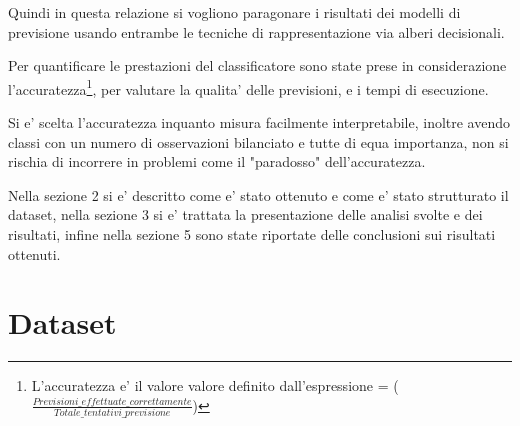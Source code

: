 \documentclass[runningheads]{llncs}
\begin{document}
Quindi in questa relazione si vogliono paragonare i risultati dei modelli di previsione usando entrambe le tecniche di rappresentazione via alberi decisionali. 

Per quantificare le prestazioni del classificatore sono state prese in considerazione l'accuratezza\footnote{L'accuratezza e' il valore valore definito dall'espressione = ($\frac{ Previsioni\_effettuate\_correttamente}{Totale\_tentativi\_previsione}$)}, per valutare la qualita' delle previsioni, e i tempi di esecuzione.

Si e' scelta l'accuratezza inquanto misura facilmente interpretabile, inoltre avendo classi con un numero di osservazioni bilanciato e tutte di equa importanza, non si rischia di incorrere in problemi come il "paradosso" dell’accuratezza.

Nella sezione 2 si e' descritto come e' stato ottenuto e come e' stato strutturato il dataset, nella sezione 3 si e' trattata la presentazione delle analisi svolte e dei risultati, infine nella sezione 5 sono state riportate delle conclusioni sui risultati ottenuti.



%
%

\section{Dataset}
\label{sec:dataset}
\end{document}

